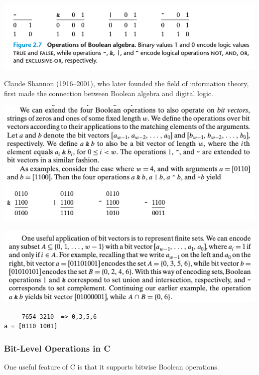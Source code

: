 \documentclass[11pt]{article}
\begin{document}
\begin{center}
\includegraphics[width=.9\linewidth]{pics/operations-of-boolean-algebra.png}
\end{center}

Claude Shannon (1916–2001), who later founded the field of information theory, first made the connection between Boolean algebra and digital logic.\\

\begin{center}
\includegraphics[width=.9\linewidth]{pics/operations-on-bit-vector.png}
\end{center}

\begin{center}
\includegraphics[width=.9\linewidth]{pics/bit-vector-to-represent-finite-set.png}
\end{center}


\begin{verbatim}
     7654 3210  => 0,3,5,6
a = [0110 1001]
\end{verbatim}


\subsubsection{Bit-Level Operations in C}
\label{sec:orgfbe5e2b}
One useful feature of C is that it supports bitwise Boolean operations.\\
\end{document}
